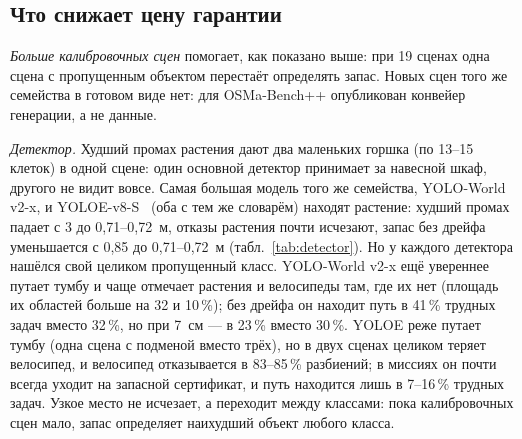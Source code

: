 \subsection{Что снижает цену гарантии}\label{sec:lower}

\begin{table}[htbp]
\centering\scriptsize\setlength{\tabcolsep}{3.2pt}
\caption{Детекторы с одним словарём из 98 классов, их объединение (в клетке --- максимум, среднее или второе по величине из трёх долей класса) и каскад с проверкой CLIP: медианный запас совместного варианта (м) и доля разбиений с отказом, доля трудных задач с путём и доля успешных случайных миссий}
\label{tab:detector}

\end{table}

\emph{Больше калибровочных сцен} помогает, как показано выше: при 19 сценах одна сцена с пропущенным объектом перестаёт определять запас. Новых сцен того же семейства в готовом виде нет: для OSMa-Bench++ опубликован конвейер генерации, а не данные.

\emph{Детектор.} Худший промах растения дают два маленьких горшка (по 13--15 клеток) в одной сцене: один основной детектор принимает за навесной шкаф, другого не видит вовсе. Самая большая модель того же семейства, YOLO-World v2-x, и YOLOE-v8-S~\cite{yoloe} (оба с тем же словарём) находят растение: худший промах падает с 3 до 0,71--0,72~м, отказы растения почти исчезают, запас без дрейфа уменьшается с 0,85 до 0,71--0,72~м (табл.~\ref{tab:detector}). Но у каждого детектора нашёлся свой целиком пропущенный класс. YOLO-World v2-x ещё увереннее путает тумбу и чаще отмечает растения и велосипеды там, где их нет (площадь их областей больше на 32 и 10\,\%); без дрейфа он находит путь в 41\,\% трудных задач вместо 32\,\%, но при 7~см --- в 23\,\% вместо 30\,\%. YOLOE реже путает тумбу (одна сцена с подменой вместо трёх), но в двух сценах целиком теряет велосипед, и велосипед отказывается в 83--85\,\% разбиений; в миссиях он почти всегда уходит на запасной сертификат, и путь находится лишь в 7--16\,\% трудных задач. Узкое место не исчезает, а переходит между классами: пока калибровочных сцен мало, запас определяет наихудший объект любого класса.

